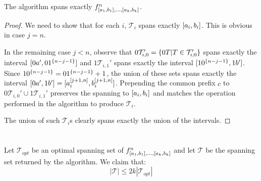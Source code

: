\section{\titlefeasibility}
\begin{theorem}
The algorithm spans exactly
$f^n_{[a_1, b_1], \ldots, [a_k, b_k]}$.
\end{theorem}

\begin{proof}
We need to show that for each $i$,
$\mathcal{T}_i$ spans exactly $[a_i, b_i]$.
This is obvious in case $j = n$.

In the remaining case $j < n$,
observe that
$0 \mathcal{T}_{i, 0}'
= \{0 T | T \in \mathcal{T}_{i, 0}'\}$
spans exactly the interval
$[0 a', 0 1^{\{n-j-1\}}]$
and $1 \mathcal{T}_{i, 1}'$
spans exactly the interval
$[1 0^{\{n-j-1\}}, 1 b']$.
Since $1 0^{\{n-j-1\}} = 0 1^{\{n-j-1\}} + 1$,
the union of these sets
spans exactly the interval
$[0 a', 1 b']
= [a_i^{[j+1, n]}, b_i^{[j+1, n]}]$.
Prepending the common prefix $c$ to
$0 \mathcal{T}_{i, 0}' \cup 1 \mathcal{T}_{i, 1}'$
preserves the spanning to
$[a_i, b_i]$
and matches the operation performed in the algorithm
to produce $\mathcal{T}_i$.

The union of such $\mathcal{T}_i$s clearly spans exactly
the union of the intervals.
\end{proof}

\section{\titleapproxratio}


\begin{theorem}
\label{theorem:2kapproxratio}
\label{theorem:spd2kapprox}
Let $\mathcal{T}_{opt}$ be an optimal spanning set of
$f^n_{[a_1, b_1], \ldots, [a_k, b_k]}$
and let $\mathcal{T}$ be the spanning set returned
by the algorithm.
We claim that:
\begin{equation*}
|\mathcal{T}| \leq 2k |\mathcal{T}_{opt}|
\end{equation*}
\end{theorem}

